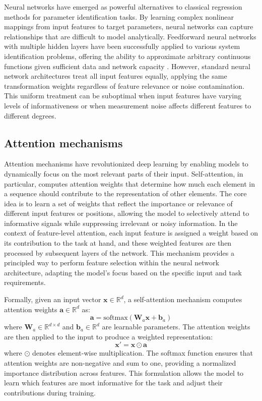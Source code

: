 \documentclass[Afour,sageh,times]{sagej}
\begin{document}
Neural networks have emerged as powerful alternatives to classical regression methods for parameter identification tasks. By learning complex nonlinear mappings from input features to target parameters, neural networks can capture relationships that are difficult to model analytically. Feedforward neural networks with multiple hidden layers have been successfully applied to various system identification problems, offering the ability to approximate arbitrary continuous functions given sufficient data and network capacity \citep{Narendra1990IdentificationAC}. However, standard neural network architectures treat all input features equally, applying the same transformation weights regardless of feature relevance or noise contamination. This uniform treatment can be suboptimal when input features have varying levels of informativeness or when measurement noise affects different features to different degrees.

\subsection{Attention mechanisms}
\label{sec:attention}

Attention mechanisms have revolutionized deep learning by enabling models to dynamically focus on the most relevant parts of their input. Self-attention, in particular, computes attention weights that determine how much each element in a sequence should contribute to the representation of other elements. The core idea is to learn a set of weights that reflect the importance or relevance of different input features or positions, allowing the model to selectively attend to informative signals while suppressing irrelevant or noisy information. In the context of feature-level attention, each input feature is assigned a weight based on its contribution to the task at hand, and these weighted features are then processed by subsequent layers of the network. This mechanism provides a principled way to perform feature selection within the neural network architecture, adapting the model's focus based on the specific input and task requirements.

Formally, given an input vector $\mathbf{x} \in \mathbb{R}^d$, a self-attention mechanism computes attention weights $\mathbf{a} \in \mathbb{R}^d$ as:
\begin{equation}
\mathbf{a} = \text{softmax}(\mathbf{W}_a \mathbf{x} + \mathbf{b}_a)
\end{equation}
where $\mathbf{W}_a \in \mathbb{R}^{d \times d}$ and $\mathbf{b}_a \in \mathbb{R}^d$ are learnable parameters. The attention weights are then applied to the input to produce a weighted representation:
\begin{equation}
\mathbf{x}' = \mathbf{x} \odot \mathbf{a}
\end{equation}
where $\odot$ denotes element-wise multiplication. The softmax function ensures that attention weights are non-negative and sum to one, providing a normalized importance distribution across features. This formulation allows the model to learn which features are most informative for the task and adjust their contributions during training.
\end{document}
